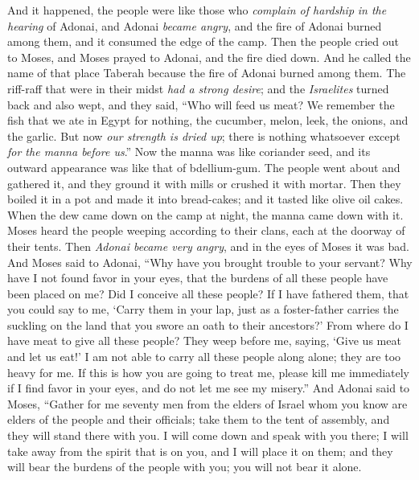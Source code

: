 \begin{biblechapter} %
 And it happened, the people were like those who \textit{complain of hardship} \textit{in the hearing} of Adonai, and Adonai \textit{became angry}, and the fire of Adonai burned among them, and it consumed the edge of the camp.
\verse Then the people cried out to Moses, and Moses prayed to Adonai, and the fire died down.
\verse And he called the name of that place Taberah because the fire of Adonai burned among them.
\verse The riff-raff that were in their midst \textit{had a strong desire}; and the \textit{Israelites} turned back and also wept, and they said, “Who will feed us meat?
\verse We remember the fish that we ate in Egypt for nothing, the cucumber, melon, leek, the onions, and the garlic.
\verse But now \textit{our strength is dried up}; there is nothing whatsoever except \textit{for the manna before us}.”
\verse Now the manna was like coriander seed, and its outward appearance was like that of bdellium-gum.
\verse The people went about and gathered it, and they ground it with mills or crushed it with mortar. Then they boiled it in a pot and made it into bread-cakes; and it tasted like olive oil cakes.
\verse When the dew came down on the camp at night, the manna came down with it.
\verse Moses heard the people weeping according to their clans, each at the doorway of their tents. Then \textit{Adonai became very angry}, and in the eyes of Moses it was bad.
\verse And Moses said to Adonai, “Why have you brought trouble to your servant? Why have I not found favor in your eyes, that the burdens of all these people have been placed on me?
\verse Did I conceive all these people? If I have fathered them, that you could say to me, ‘Carry them in your lap, just as a foster-father carries the suckling on the land that you swore an oath to their ancestors?’
\verse From where do I have meat to give all these people? They weep before me, saying, ‘Give us meat and let us eat!’
\verse I am not able to carry all these people along alone; they are too heavy for me.
\verse If this is how you are going to treat me, please kill me immediately if I find favor in your eyes, and do not let me see my misery.”
\verse And Adonai said to Moses, “Gather for me seventy men from the elders of Israel whom you know are elders of the people and their officials; take them to the tent of assembly, and they will stand there with you.
\verse I will come down and speak with you there; I will take away from the spirit that is on you, and I will place it on them; and they will bear the burdens of the people with you; you will not bear it alone.

\end{biblechapter}
